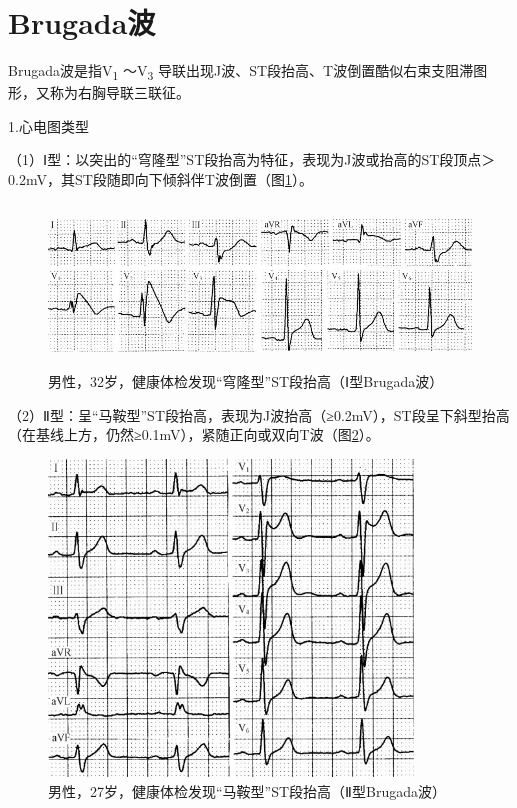 \protect\hypertarget{text00010.htmlux5cux23subid71}{}{}

\section{Brugada波}

Brugada波是指V\textsubscript{1} ～V\textsubscript{3}
导联出现J波、ST段抬高、T波倒置酷似右束支阻滞图形，又称为右胸导联三联征。

1.心电图类型

（1）Ⅰ型：以突出的“穹隆型”ST段抬高为特征，表现为J波或抬高的ST段顶点＞0.2mV，其ST段随即向下倾斜伴T波倒置（图\ref{fig4-4}）。

\begin{figure}[!htbp]
 \centering
 \includegraphics[width=5.48958in,height=1.70833in]{./images/Image00079.jpg}
 \captionsetup{justification=centering}
 \caption{男性，32岁，健康体检发现“穹隆型”ST段抬高（Ⅰ型Brugada波）}
 \label{fig4-4}
  \end{figure} 

（2）Ⅱ型：呈“马鞍型”ST段抬高，表现为J波抬高（≥0.2mV），ST段呈下斜型抬高（在基线上方，仍然≥0.1mV），紧随正向或双向T波（图\ref{fig4-5}）。

\begin{figure}[!htbp]
 \centering
 \includegraphics[width=3.8125in,height=3.3125in]{./images/Image00080.jpg}
 \captionsetup{justification=centering}
 \caption{男性，27岁，健康体检发现“马鞍型”ST段抬高（Ⅱ型Brugada波）}
 \label{fig4-5}
  \end{figure} 

